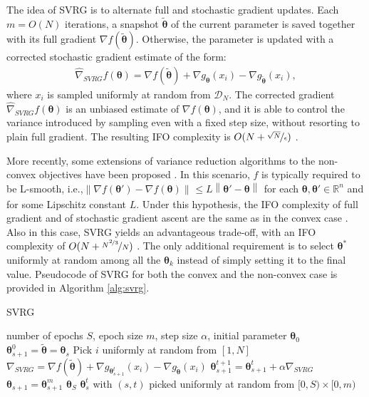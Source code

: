 \documentclass{article}
\makeatletter
\theoremstyle{remark}
\theoremstyle{definition}
\DeclareRobustCommand{\ie}{i.e.,\@\xspace}
\newcommand{\realspace}{\mathbb R}      %
\newcommand{\norm}[2][\infty]{\left\|#2\right\|_{#1}}
\newcommand{\vtheta}{\boldsymbol{\theta}}
\makeatother
\begin{document}
The idea of SVRG is to alternate full and stochastic gradient updates. Each $m = O(N)$ iterations, a snapshot $\tilde{\vtheta}$ of the current parameter is saved together with its full gradient $\nabla f(\tilde{\vtheta})$.
Otherwise, the parameter is updated with a corrected stochastic gradient estimate of the form:
\begin{align*}
\widehat{\nabla}_{SVRG}f(\vtheta) = 
	\nabla f(\tilde{\vtheta}) + 
	\nabla g_{\vtheta}(x_i) -
	\nabla g_{\tilde{\vtheta}}(x_i),
\end{align*} 
where $x_i$ is sampled uniformly at random from $\mathcal{D}_N$. The corrected gradient $\widehat{\nabla}_{SVRG}f(\vtheta)$ is an unbiased estimate of $\nabla f(\vtheta)$, and it is able to control the variance introduced by sampling even with a fixed step size, without resorting to plain full gradient. The resulting IFO complexity is $O(N+\nicefrac{\sqrt{N}}{\epsilon})$ \cite{reddi2016stochastic}.

More recently, some extensions of variance reduction algorithms to the non-convex objectives have been proposed \cite{reddi2016stochastic} \cite{allen2016variance} \cite{reddi2016stochastic} \cite{reddi2016fast}. In this scenario, $f$ is typically required to be L-smooth, \ie $\norm[]{\nabla f(\vtheta') - \nabla f(\vtheta)} \leq L\norm[]{\vtheta'-\vtheta}$ for each $\vtheta,\vtheta'\in\realspace^n$ and for some Lipschitz constant $L$. Under this hypothesis, the IFO complexity of full gradient  and of stochastic gradient ascent are the same as in the convex case \cite{nesterov2013introductory} \cite{ghadimi2013stochastic}. Also in this case, SVRG yields an advantageous trade-off, with an IFO complexity of $O(N + \nicefrac{N^{\nicefrac{2}{3}}}{N})$ \cite{reddi2016stochastic}. The only additional requirement is to select $\vtheta^*$ uniformly at random among all the $\vtheta_k$ instead of simply setting it to the final value. Pseudocode of SVRG for both the convex and the non-convex case is provided in Algorithm \ref{alg:svrg}. 


\begin{algorithm}[tb]
	\caption{SVRG}
	\label{alg:svrg}
	\begin{algorithmic}
		 number of epochs $S$, epoch size $m$, step size $\alpha$, initial parameter $\vtheta_0$
		\STATE $\vtheta_{s+1}^0 = \tilde{\vtheta} = \vtheta_s$
		\STATE Pick $i$ uniformly at random from $[1,N]$
		\STATE $\nabla_{SVRG} = 
					\nabla f(\tilde{\vtheta}) + 
					\nabla g_{\vtheta_{s+1}^t}(x_i) -
					\nabla g_{\tilde{\vtheta}}(x_i)$
		\STATE $\vtheta_{s+1}^{t+1} = \vtheta_{s+1}^{t} + \alpha\nabla_{SVRG}$
		\ENDFOR
		\STATE $\vtheta_{s+1} = \vtheta_{s+1}^m$
		\ENDFOR
		 $\vtheta_S$
		 $\vtheta_s^t$ with $(s,t)$ picked uniformly at random from $[0,S)\times[0,m)$
	\end{algorithmic}
\end{algorithm}
\end{document}
